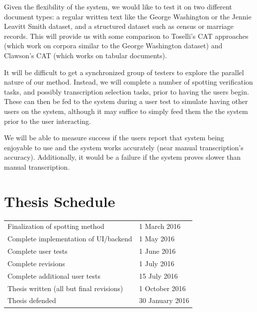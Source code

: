 \documentclass[ms]{byuprop}
\begin{document}
Given the flexibility of the system, we would like to test it on two different document types: a regular written text like the George Washington\cite{GW} or the Jennie Leavitt Smith\cite{Smith} dataset, and a structured dataset such as census or marriage records. This will provide us with some comparison to Toselli's CAT approaches (which work on corpora similar to the George Washington dataset) and Clawson's CAT (which works on tabular documents).

It will be difficult to get a synchronized group of testers to explore the parallel nature of our method. Instead, we will complete a number of spotting verification tasks, and possibly transcription selection tasks, prior to having the users begin. These can then be fed to the system during a user test to simulate having other users on the system, although it may suffice to simply feed them the the system prior to the user interacting.

We will be able to measure success if the users report that system being enjoyable to use and the system works accurately (near manual transcription's accuracy). Additionally, it would be a failure if the system proves slower than manual transcription.


\section{Thesis Schedule}
\begin{table}
\centering
\begin{tabular}{ll}
Finalization of spotting method          & 1 March 2016 \\
Complete implementation of UI/backend    & 1 May 2016    \\
Complete user tests                      & 1 June 2016   \\
Complete revisions                       & 1 July 2016      \\
Complete additional user tests           & 15 July 2016     \\
Thesis written (all but final revisions) & 1 October 2016     \\
Thesis defended                          & 30 January 2016    
\end{tabular}
\end{table}




\end{document}
